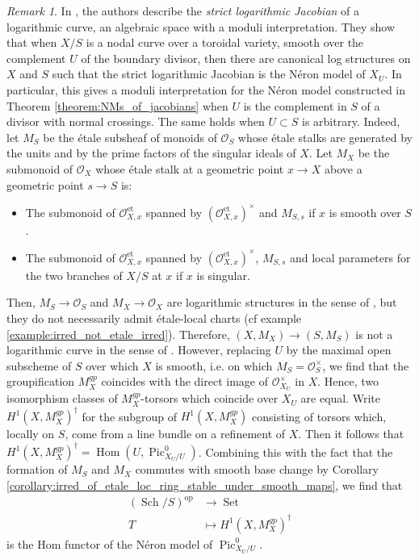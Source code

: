 \documentclass[a4paper,10pt,twoside]{article}
\newcommand{\on}[1]{\operatorname{#1}}
\renewcommand{\O}{\mathcal{O}}
\DeclareMathOperator{\pic}{Pic}
\DeclareMathOperator{\Hom}{Hom}
\DeclareMathOperator{\set}{Set}
\DeclareMathOperator{\sch}{Sch}
\theoremstyle{definition}
\theoremstyle{remark}
\newtheorem{rem}{Remark}[thm]
\renewcommand{\on}[1]{\operatorname{#1}}
\begin{document}
\begin{rem}\label{remark:strict_log_jac_vs_pic_aggregate}
In \cite{HMOPModelsJacobians}, the authors describe the \emph{strict logarithmic Jacobian} of a logarithmic curve, an algebraic space with a moduli interpretation. They show that when $X/S$ is a nodal curve over a toroidal variety, smooth over the complement $U$ of the boundary divisor, then there are canonical log structures on $X$ and $S$ such that the strict logarithmic Jacobian is the Néron model of $X_U$. In particular, this gives a moduli interpretation for the Néron model constructed in Theorem \ref{theorem:NMs_of_jacobians} when $U$ is the complement in $S$ of a divisor with normal crossings. The same holds when $U\subset S$ is arbitrary. Indeed, let $M_S$ be the étale subsheaf of monoids of $\O_S$ whose étale stalks are generated by the units and by the prime factors of the singular ideals of $X$. Let $M_X$ be the submonoid of $\O_X$ whose étale stalk at a geometric point $x\to X$ above a geometric point $s\to S$ is:
\begin{itemize}
\item The submonoid of $\O_{X,x}^{\on{et}}$ spanned by $(\O_{X,x}^{\on{et}})^\times$ and $M_{S,s}$ if $x$ is smooth over $S$.
\item The submonoid of $\O_{X,x}^{\on{et}}$ spanned by $(\O_{X,x}^{\on{et}})^\times$, $M_{S,s}$ and local parameters for the two branches of $X/S$ at $x$ if $x$ is singular.
\end{itemize}
Then, $M_S\to \O_S$ and $M_X\to \O_X$ are logarithmic structures in the sense of \cite{Kato}, but they do not necessarily admit étale-local charts (cf example \ref{example:irred_not_etale_irred}). Therefore, $(X,M_X)\to (S,M_S)$ is not a logarithmic curve in the sense of \cite{HMOPModelsJacobians}. However, replacing $U$ by the maximal open subscheme of $S$ over which $X$ is smooth, i.e. on which $M_S=\O_S^\times$, we find that the groupification $M_X^{gp}$ coincides with the direct image of $\O_{X_U}^\times$ in $X$. Hence, two isomorphism classes of $M_X^{gp}$-torsors which coincide over $X_U$ are equal. Write $H^1(X,M_X^{gp})^\dagger$ for the subgroup of $H^1(X,M_X^{gp})$ consisting of torsors which, locally on $S$, come from a line bundle on a refinement of $X$. Then it follows that $H^1(X,M_X^{gp})^\dagger=\Hom(U,\pic^0_{X_U/U})$. Combining this with the fact that the formation of $M_S$ and $M_X$ commutes with smooth base change by Corollary \ref{corollary:irred_of_etale_loc_ring_stable_under_smooth_maps}, we find that
\begin{align*}
(\sch/S)^{\on{op}} & \to \set \\
T & \mapsto H^1(X,M_X^{gp})^\dagger
\end{align*}
is the Hom functor of the Néron model of $\pic^0_{X_U/U}$.
\end{rem}
\end{document}
